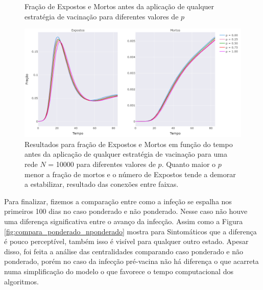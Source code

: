 \begin{figure}[H]
    \centering
    \caption{Fração de Expostos e Mortos antes da aplicação de qualquer estratégia de vacinação para diferentes valores de $p$}
    \vspace{5pt}
    \includegraphics[width=\textwidth]{figuras/pre_vacina_mortos_p_nponderado.png}
    \captionsetup{font=small,justification=justified}
    \caption*{Resultados para fração de
    Expostos e Mortos em função do tempo antes da aplicação de qualquer estratégia de vacinação para uma rede $N$ = 10000 para diferentes valores de $p$. Quanto maior o $p$ menor a fração de mortos e o número de Expostos tende a demorar a estabilizar, resultado das conexões entre faixas.}
    \label{fig:pre_vacina_mortos_p}
\end{figure}

Para finalizar, fizemos a comparação entre como a 
infeção se espalha nos primeiros 100 dias no caso ponderado e não ponderado.
Nesse caso não houve uma diferença significativa entre o avanço da infecção.
Assim como a Figura \ref{fig:compara_ponderado_nponderado} mostra para Sintomáticos que a diferença é pouco perceptível, também isso é visível para qualquer outro estado. 
Apesar disso, 
foi
feita a análise das centralidades comparando caso ponderado e não ponderado, porém no caso da infecção pré-vacina não há diferença o que acarreta numa simplificação do modelo o que favorece o tempo computacional dos algoritmos.

